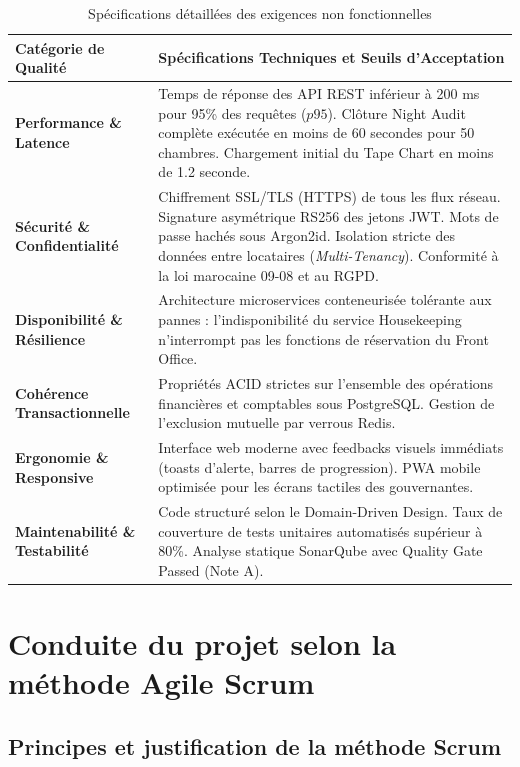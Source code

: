 \documentclass[12pt,a4paper,oneside]{report}
\begin{document}
\begin{table}[H]
\centering
\small
\renewcommand{\arraystretch}{1.3}
\begin{tabularx}{\textwidth}{|p{3.5cm}|X|}
\hline
\textbf{Catégorie de Qualité} & \textbf{Spécifications Techniques et Seuils d'Acceptation} \\
\hline
\textbf{Performance \& Latence} & Temps de réponse des API REST inférieur à 200 ms pour 95\% des requêtes ($p95$). Clôture Night Audit complète exécutée en moins de 60 secondes pour 50 chambres. Chargement initial du Tape Chart en moins de 1.2 seconde. \\
\hline
\textbf{Sécurité \& Confidentialité} & Chiffrement SSL/TLS (HTTPS) de tous les flux réseau. Signature asymétrique RS256 des jetons JWT. Mots de passe hachés sous Argon2id. Isolation stricte des données entre locataires (\textit{Multi-Tenancy}). Conformité à la loi marocaine 09-08 et au RGPD. \\
\hline
\textbf{Disponibilité \& Résilience} & Architecture microservices conteneurisée tolérante aux pannes : l'indisponibilité du service Housekeeping n'interrompt pas les fonctions de réservation du Front Office. \\
\hline
\textbf{Cohérence Transactionnelle} & Propriétés ACID strictes sur l'ensemble des opérations financières et comptables sous PostgreSQL. Gestion de l'exclusion mutuelle par verrous Redis. \\
\hline
\textbf{Ergonomie \& Responsive} & Interface web moderne avec feedbacks visuels immédiats (toasts d'alerte, barres de progression). PWA mobile optimisée pour les écrans tactiles des gouvernantes. \\
\hline
\textbf{Maintenabilité \& Testabilité} & Code structuré selon le Domain-Driven Design. Taux de couverture de tests unitaires automatisés supérieur à 80\%. Analyse statique SonarQube avec Quality Gate Passed (Note A). \\
\hline
\end{tabularx}
\caption{Spécifications détaillées des exigences non fonctionnelles}
\label{tab:besoins_nf_detail}
\end{table}

\section{Conduite du projet selon la méthode Agile Scrum}

\subsection{Principes et justification de la méthode Scrum}
\end{document}
